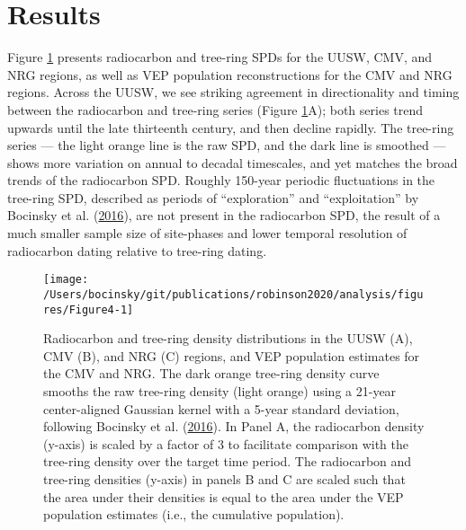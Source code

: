 \documentclass[
]{article}
\begin{document}
\hypertarget{results}{%
\section*{Results}\label{results}}

Figure \ref{fig:Figure4} presents radiocarbon and tree-ring SPDs for the UUSW, CMV, and NRG regions, as well as VEP population reconstructions for the CMV and NRG regions. Across the UUSW, we see striking agreement in directionality and timing between the radiocarbon and tree-ring series (Figure \ref{fig:Figure4}A); both series trend upwards until the late thirteenth century, and then decline rapidly. The tree-ring series --- the light orange line is the raw SPD, and the dark line is smoothed --- shows more variation on annual to decadal timescales, and yet matches the broad trends of the radiocarbon SPD. Roughly 150-year periodic fluctuations in the tree-ring SPD, described as periods of ``exploration'' and ``exploitation'' by Bocinsky et al. (\protect\hyperlink{ref-Bocinsky2016}{2016}), are not present in the radiocarbon SPD, the result of a much smaller sample size of site-phases and lower temporal resolution of radiocarbon dating relative to tree-ring dating.



\begin{figure}

{\centering \texttt{[image: /Users/bocinsky/git/publications/robinson2020/analysis/figures/Figure4-1]} 

}

\caption{Radiocarbon and tree-ring density distributions in the UUSW (A), CMV (B), and NRG (C) regions, and VEP population estimates for the CMV and NRG. The dark orange tree-ring density curve smooths the raw tree-ring density (light orange) using a 21-year center-aligned Gaussian kernel with a 5-year standard deviation, following Bocinsky et al. (\protect\hyperlink{ref-Bocinsky2016}{2016}). In Panel A, the radiocarbon density (y-axis) is scaled by a factor of 3 to facilitate comparison with the tree-ring density over the target time period. The radiocarbon and tree-ring densities (y-axis) in panels B and C are scaled such that the area under their densities is equal to the area under the VEP population estimates (i.e., the cumulative population).}\label{fig:Figure4}
\end{figure}
\end{document}
